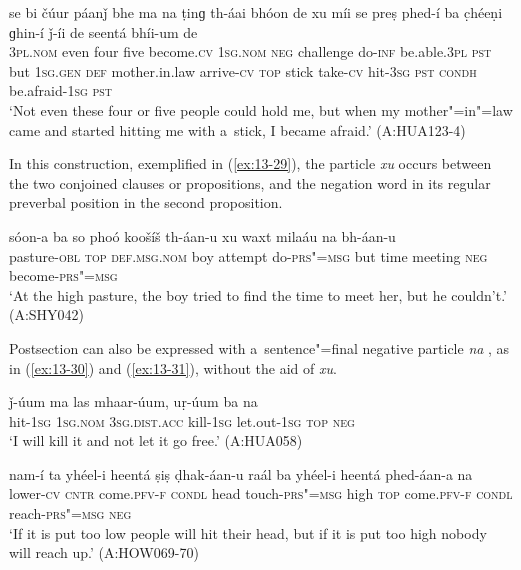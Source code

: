 \begin{exe}
\ex
\label{ex:13-28}
\gll se bi čúur páanǰ bhe ma na ṭinɡ th-áai bhóon de xu míi se preṣ phed-í ba c̣héeṇi ɡhin-í ǰ-íi de seentá bhíi-um de\\
\textsc{3pl.nom} even four five become.\textsc{cv} \textsc{1sg.nom} \textsc{neg}  challenge do-\textsc{inf} be.able.\textsc{3pl} \textsc{pst} but \textsc{1sg.gen}  \textsc{def} mother.in.law arrive-\textsc{cv} \textsc{top} stick take-\textsc{cv} hit-\textsc{3sg} \textsc{pst} \textsc{condh} be.afraid-\textsc{1sg} \textsc{pst}\\
\glt `Not even these four or five people could hold me, but when my mother"=in"=law came and started hitting me with a~stick, I became afraid.' (A:HUA123-4) 
\end{exe}

 In this construction, exemplified in (\ref{ex:13-29}), the particle \textit{xu} occurs between the two conjoined clauses or propositions, and the negation word in its regular preverbal position in the second proposition.

\begin{exe}
\ex
\label{ex:13-29}
\gll sóon-a ba so phoó koošíš th-áan-u xu waxt milaáu na bh-áan-u \\
pasture-\textsc{obl} \textsc{top} \textsc{def.msg.nom} boy attempt   do-\textsc{prs"=msg} but time meeting \textsc{neg} become-\textsc{prs"=msg} \\
\glt `At the high pasture, the boy tried to find the time to meet her, but he couldn't.' (A:SHY042) 
\end{exe}

 Postsection can also be expressed with a~sentence"=final negative particle \textit{na} , as in (\ref{ex:13-30}) and (\ref{ex:13-31}), without the aid of \textit{xu}. 

\begin{exe}
\ex
\label{ex:13-30}
\gll ǰ-úum ma las mhaar-úum, uṛ-úum ba na \\
hit-\textsc{1sg} \textsc{1sg.nom} \textsc{3sg.dist.acc} kill-\textsc{1sg} let.out-\textsc{1sg}
\textsc{top} \textsc{neg} \\
\glt `I will kill it and not let it go free.' (A:HUA058)

\ex
\label{ex:13-31}
\gll nam-í ta yhéel-i heentá ṣiṣ ḍhak-áan-u raál ba yhéel-i heentá phed-áan-a na \\
lower-\textsc{cv} \textsc{cntr} come.\textsc{pfv-f} \textsc{condl} head touch-\textsc{prs"=msg}  high \textsc{top} come.\textsc{pfv-f} \textsc{condl} reach-\textsc{prs"=msg} \textsc{neg} \\
\glt `If it is put too low people will hit their head, but if it is put too high nobody will reach up.' (A:HOW069-70)
\end{exe}

